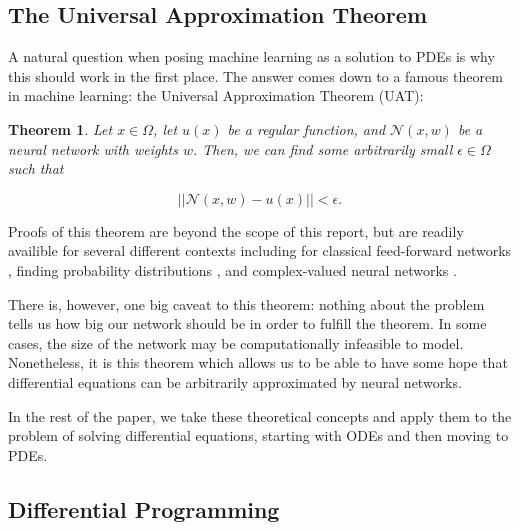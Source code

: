 \documentclass{CUP-JNL-DTM}%
\newtheorem{theorem}{Theorem}[section]
\theoremstyle{definition}
\numberwithin{equation}{section}
\newcommand{\net}{\mathcal{N}}
\begin{document}

\subsection{The Universal Approximation Theorem}

A natural question when posing machine learning as a solution to PDEs is why this should work in the first place. The answer comes down to a famous theorem in machine learning: the Universal Approximation Theorem (UAT):

\begin{theorem}

Let $x \in \Omega$, let $u(x)$ be a regular function, and $\net(x,w)$ be a neural network with weights $w$. Then, we can find some arbitrarily small $\epsilon \in \Omega$ such that 

\begin{equation}
	||\net(x,w) - u(x)|| < \epsilon. 
\end{equation}

\end{theorem}

\noindent Proofs of this theorem are beyond the scope of this report, but are readily availible for several different contexts including for classical feed-forward networks \cite{hornikMultilayerFeedforwardNetworks1989, hornikApproximationCapabilitiesMultilayer1991}, finding probability distributions \cite{luUniversalApproximationTheorem2020}, and complex-valued neural networks \cite{voigtlaenderUniversalApproximationTheorem2020}. 

There is, however, one big caveat to this theorem: nothing about the problem tells us how big our network should be in order to fulfill the theorem. In some cases, the size of the network may be computationally infeasible to model. Nonetheless, it is this theorem which allows us to be able to have some hope that differential equations can be arbitrarily approximated by neural networks. 

In the rest of the paper, we take these theoretical concepts and apply them to the problem of solving differential equations, starting with ODEs and then moving to PDEs. 

\subsection{Differential Programming}

\end{document}
